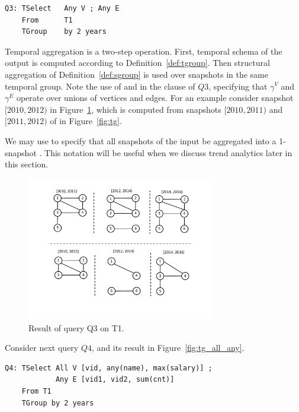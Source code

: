 \begin{small}
\begin{verbatim}
Q3: TSelect   Any V ; Any E 
    From      T1
    TGroup    by 2 years
\end{verbatim}
\end{small}

Temporal aggregation is a two-step operation.  First, temporal schema
of the output is computed according to Definition~\ref{def:tgroup}.
Then structural aggregation of Definition~\ref{def:sgroup} is used
over snapshots in the same temporal group.  Note the use of  and  in the  clause of $Q3$,
specifying that $\gamma^{V}$ and $\gamma^{E}$ operate over unions of
vertices and edges.  For an example consider snapshot $[2010, 2012)$
  in Figure~\ref{fig:q3}, which is computed from snapshots $[2010,
    2011)$ and $[2011, 2012)$ of  in Figure~\ref{fig:tg}.


We may use  to specify that all snapshots of the
input \tg be aggregated into a 1-snapshot \tg.  This notation will be
useful when we discuss trend analytics later in this section.

\begin{figure}
\includegraphics[width=3.2in]{figs/TGroupAny.pdf}
\caption{Result of query Q3 on T1.}
\label{fig:q3}
\end{figure}

Consider next query $Q4$, and its result in
Figure~\ref{fig:tg_all_any}.

\begin{small}
\begin{verbatim}
Q4: TSelect All V [vid, any(name), max(salary)] ; 
            Any E [vid1, vid2, sum(cnt)] 
    From T1 
    TGroup by 2 years
\end{verbatim}
\end{small}

